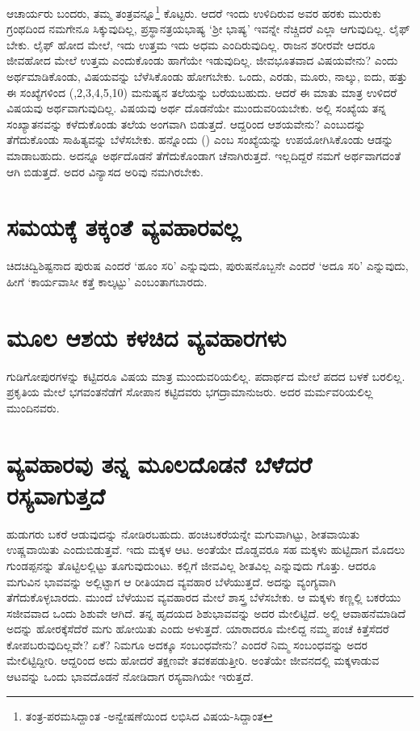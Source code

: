 ಆಚಾರ್ಯರು ಬಂದರು, ತಮ್ಮ ತಂತ್ರವನ್ನೂ\footnote{ತಂತ್ರ-ಪರಮಸಿದ್ದಾಂತ -ಅನ್ವೇಷಣೆಯಿಂದ ಲಭಿಸಿದ ವಿಷಯ-ಸಿದ್ದಾಂತ} ಕೊಟ್ಟರು. ಆದರೆ ಇಂದು ಉಳಿದಿರುವ ಅವರ ಹರಕು ಮುರುಕು ಗ್ರಂಥದಿಂದ ನಮಗೇನೂ ಸಿಕ್ಕುವುದಿಲ್ಲ, ಪ್ರಸ್ಥಾನತ್ರಯಭಾಷ್ಯ `ಶ್ರೀ ಭಾಷ್ಯ' ಇವನ್ನೇ ನೆಚ್ಚಿದರೆ ಎಲ್ಲಾ ಆಗುವುದಿಲ್ಲ. ಲೈಫ್ ಬೇಕು. ಲೈಫ್ ಹೋದ ಮೇಲೆ, ಇದು ಉತ್ತಮ ಇದು ಅಧಮ ಎಂದಿರುವುದಿಲ್ಲ. ರಾಜನ ಶರೀರವೇ ಆದರೂ ಜೀವಹೋದ ಮೇಲೆ ಉತ್ತಮ ಎಂದುಕೊಂಡು ಹಾಗೆಯೇ ಇಡುವುದಿಲ್ಲ. ಜೀವಭೂತವಾದ ವಿಷಯವೇನು? ಎಂದು ಅರ್ಥಮಾಡಿಕೊಂಡು, ವಿಷಯವನ್ನು ಬೆಳೆಸಿಕೊಂಡು ಹೋಗಬೇಕು. ಒಂದು, ಎರಡು, ಮೂರು, ನಾಲ್ಕು, ಐದು, ಹತ್ತು ಈ ಸಂಖ್ಯೆಗಳಿಂದ {(,2,3,4,5,10)} ಮನುಷ್ಯನ ತಲೆಯನ್ನು ಬರೆಯಬಹುದು. ಆದರೆ ಈ ಮಾತು ಮಾತ್ರ ಉಳಿದರೆ ವಿಷಯವು ಅರ್ಥವಾಗುವುದಿಲ್ಲ. ವಿಷಯವು ಅರ್ಥ ದೊಡನೆಯೇ ಮುಂದುವರಿಯಬೇಕು. ಅಲ್ಲಿ ಸಂಖ್ಯೆಯ ತನ್ನ ಸಂಖ್ಯಾತನವನ್ನು ಕಳೆದುಕೊಂಡು ತಲೆಯ ಅಂಗವಾಗಿ ಬಿಡುತ್ತದೆ. ಆದ್ದರಿಂದ ಆಶಯವೇನು? ಎಂಬುದನ್ನು ತೆಗೆದುಕೊಂಡು ಸಾಹಿತ್ಯವನ್ನು ಬೆಳೆಸಬೇಕು. ಹನ್ನೊಂದು {()} ಎಂಬ ಸಂಖ್ಯೆಯನ್ನು ಉಪಯೋಗಿಸಿಕೊಂಡು ಆಡನ್ನು ಮಾಡಾಬಹುದು. ಅದನ್ನೂ ಅರ್ಥದೊಡನೆ ತೆಗೆದುಕೊಂಡಾಗ ಚೆನಾಗಿರುತ್ತದೆ. ಇಲ್ಲದಿದ್ದರೆ ನಮಗೆ ಅರ್ಥವಾಗದಂತೆ ಆಗಿ ಬಿಡುತ್ತದೆ. ಅದರ ವಿನ್ಯಾಸದ ಅರಿವು ನಮಗಿರಬೇಕು.

\section*{ಸಮಯಕ್ಕೆ  ತಕ್ಕಂತೆ ವ್ಯವಹಾರವಲ್ಲ}

ಚಿದಚಿದ್ವಿಶಿಷ್ಟನಾದ ಪುರುಷ ಎಂದರೆ `ಹೂಂ ಸರಿ' ಎನ್ನುವುದು, ಪುರುಷನೊಬ್ಬನೇ ಎಂದರೆ `ಅದೂ ಸರಿ' ಎನ್ನುವುದು, ಹೀಗೆ `ಕಾರ್ಯವಾಸೀ ಕತ್ತೆ ಕಾಲ್ಕಟ್ಟು' ಎಂಬಂತಾಗಬಾರದು.

\section*{ಮೂಲ ಆಶಯ ಕಳಚಿದ ವ್ಯವಹಾರಗಳು}

ಗುಡಿಗೋಪುರಗಳನ್ನು ಕಟ್ಟಿದರೂ ವಿಷಯ ಮಾತ್ರ ಮುಂದುವರಿಯಲಿಲ್ಲ. ಪದಾರ್ಥದ ಮೇಲೆ ಪದದ ಬಳಕೆ ಬರಲಿಲ್ಲ. ಪ್ರಕೃತಿಯ ಮೇಲೆ ಭಗವಂತನೆಡೆಗೆ ಸೋಪಾನ ಕಟ್ಟಿದವರು ಭಗದ್ರಾಮಾನುಜರು. ಅದರ ಮರ್ಮವರಿಯಲಿಲ್ಲ ಮುಂದಿನವರು.

\section*{ವ್ಯವಹಾರವು ತನ್ನ ಮೂಲದೊಡನೆ ಬೆಳೆದರೆ ರಸ್ಯವಾಗುತ್ತದೆ}

ಹುಡುಗರು ಬಕರೆ ಆಡುವುದನ್ನು ನೋಡಿರಬಹುದು. ಹಂಚಿಬಕರೆಯನ್ನೇ ಮಗುವಾಗಿಟ್ಟು, ಶೀತವಾಯಿತು ಉಷ್ಣವಾಯಿತು ಎಂದುಬಿಡುತ್ತವೆ. ಇದು ಮಕ್ಕಳ ಆಟ. ಅಂತೆಯೇ ದೊಡ್ಡವರೂ ಸಹ ಮಕ್ಕಳು ಹುಟ್ಟಿದಾಗ ಮೊದಲು ಗುಂಡಪ್ಪನನ್ನು ತೊಟ್ಟಿಲಲ್ಲಿಟ್ಟು ತೂಗುವುದುಂಟು. ಕಲ್ಲಿಗೆ ಜೀವವಿಲ್ಲ ಶೀತವಿಲ್ಲ ಎನ್ನುವುದು ಗೊತ್ತು. ಆದರೂ ಮಗುವಿನ ಭಾವವನ್ನು ಅಲ್ಲಿಟ್ಟಾಗ ಆ ರೀತಿಯಾದ ವ್ಯವಹಾರ ಬೆಳೆಯುತ್ತದೆ. ಅದನ್ನು ವ್ಯಂಗ್ಯವಾಗಿ ತೆಗೆದುಕೊಳ್ಳಬಾರದು. ಮುಂದೆ ಬೆಳೆಯುವ ವ್ಯವಹಾರದ ಮೇಲೆ ಶಾಸ್ತ್ರ ಬೆಳೆಸಬೇಕು. ಆ ಮಕ್ಕಳು ಕಣ್ಣಲ್ಲಿ ಬಕರೆಯು ಸಜೀವವಾದ ಒಂದು ಶಿಶುವೇ ಆಗಿದೆ. ತನ್ನ ಹೃದಯದ ಶಿಶುಭಾವವನ್ನು ಅದರ ಮೇಲಿಟ್ಟಿದೆ. ಅಲ್ಲಿ ಆವಾಹನೆಮಾಡಿದೆ ಅದನ್ನು ಹೋರಕ್ಕೆಸೆದೆರೆ ಮಗು ಹೋಯಿತು ಎಂದು ಅಳುತ್ತದೆ. ಯಾರಾದರೂ ಮೇಲಿದ್ದ ನಮ್ಮ ಪಂಚೆ ಕಿತ್ತೆಸೆದರೆ ಕೋಪಬರುವುದಿಲ್ಲವೇ? ಏಕೆ? ನಿಮಗೂ ಅದಕ್ಕೂ ಸಂಬಂಧವೇನು? ಎಂದರೆ ನಿಮ್ಮ ಸಂಬಂಧವನ್ನು ಅದರ ಮೇಲಿಟ್ಟಿದ್ದೀರಿ. ಆದ್ದರಿಂದ ಅದು ಹೋದರೆ ತಕ್ಷಣವೇ ತವಕಪಡುತ್ತೀರಿ. ಅಂತೆಯೇ ಜೀವನದಲ್ಲಿ ಮಕ್ಕಳಾಡುವ ಆಟವನ್ನು ಒಂದು ಭಾವದೊಡನೆ ನೋಡಿದಾಗ ರಸ್ಯವಾಗಿಯೇ ಇರುತ್ತದೆ.

